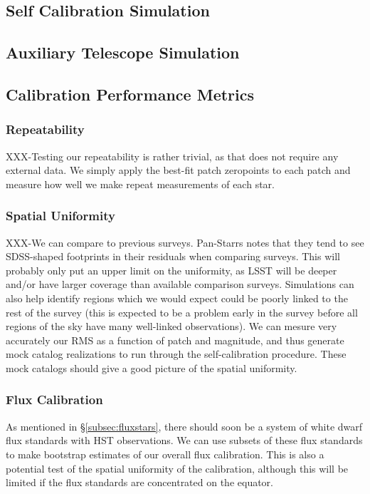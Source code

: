 \documentclass[12pt,preprint]{aastex}
\begin{document}
\subsection{Self Calibration Simulation}
\subsection{Auxiliary Telescope Simulation}

\subsection{Calibration Performance Metrics}

\subsubsection{Repeatability}

XXX-Testing our repeatability is rather trivial, as that does not require
any external data.  We simply apply the best-fit patch zeropoints to
each patch and measure how well we make repeat measurements of each
star.

\subsubsection{Spatial Uniformity}

XXX-We can compare to previous surveys.  Pan-Starrs notes that they
tend to see SDSS-shaped footprints in their residuals when comparing
surveys.  This will probably only put an upper limit on the
uniformity, as LSST will be deeper and/or have larger coverage than
available comparison surveys.  Simulations can also help identify
regions which we would expect could be poorly linked to the rest of
the survey (this is expected to be a problem early in the survey
before all regions of the sky have many well-linked observations).  We
can mesure very accurately our RMS as a function of patch and
magnitude, and thus generate mock catalog realizations to run through
the self-calibration procedure.  These mock catalogs should give a
good picture of the spatial uniformity.

\subsubsection{Flux Calibration}

As mentioned in \S\ref{subsec:fluxstars}, there should soon be a
system of white dwarf flux standards with HST observations.  We can
use subsets of these flux standards to make bootstrap estimates of our
overall flux calibration.  This is also a potential test of the
spatial uniformity of the calibration, although this will be limited
if the flux standards are concentrated on the equator.
\end{document}
